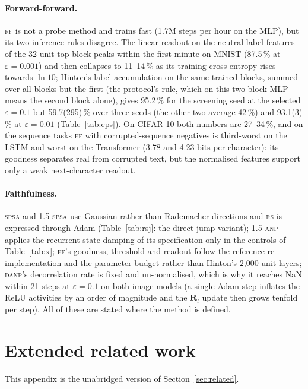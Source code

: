 \documentclass{article}
\newcommand{\method}[1]{\textsc{#1}}
\newcommand{\SPSA}{\method{spsa}}
\newcommand{\SPSAb}{\method{1.5-spsa}}
\newcommand{\RS}{\method{rs}}
\newcommand{\ANPb}{\method{1.5-anp}}
\newcommand{\DANP}{\method{danp}}
\newcommand{\FF}{\method{ff}}
\newcommand{\bR}{\mathbf{R}}
\begin{document}
\paragraph{Forward-forward.}
\FF{} is not a probe method and trains fast (1.7M steps per hour on the MLP), but its
two inference rules disagree. The linear readout on the neutral-label features of the
32-unit top block peaks within the first minute on MNIST (87.5\,\% at $\varepsilon=0.001$)
and then collapses to 11--14\,\% as its training cross-entropy rises towards $\ln 10$;
Hinton's label accumulation on the same trained blocks, summed over all blocks but the
first (the protocol's rule, which on this two-block MLP means the second block alone),
gives 95.2\,\% for the screening seed at the selected $\varepsilon=0.1$ but
59.7(295)\,\% over three seeds (the other two average 42\,\%) and 93.1(3)\,\% at
$\varepsilon=0.01$ (Table~\ref{tab:eps}). On CIFAR-10 both numbers are 27--34\,\%, and
on the sequence tasks \FF{} with corrupted-sequence negatives is third-worst on the
LSTM and worst on the Transformer (3.78 and 4.23 bits per character): its goodness separates real from corrupted text, but the normalised
features support only a weak next-character readout.

\paragraph{Faithfulness.}
\SPSA{} and \SPSAb{} use Gaussian rather than Rademacher directions and \RS{} is
expressed through Adam (Table~\ref{tab:rsj}: the direct-jump variant); \ANPb{}
applies the recurrent-state damping of its specification only in the controls of
Table~\ref{tab:x}; \FF{}'s goodness, threshold
and readout follow the reference re-implementation and the parameter budget rather
than Hinton's 2,000-unit layers; \DANP{}'s decorrelation rate is fixed and
un-normalised, which is why it reaches NaN within 21 steps at $\varepsilon=0.1$ on both
image models (a single Adam step inflates the ReLU activities by an order of
magnitude and the $\bR_l$ update then grows tenfold per step). All of these are stated
where the method is defined.

\section{Extended related work}
\label{app:related}

This appendix is the unabridged version of Section~\ref{sec:related}.
\end{document}
